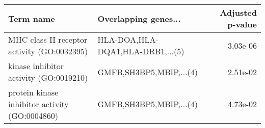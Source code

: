 \begin{tabular}{llr}
\toprule
                                     Term name &             Overlapping genes... &  Adjusted p-value \\
\midrule
   MHC class II receptor activity (GO:0032395) & HLA-DOA,HLA-DQA1,HLA-DRB1,...(5) &          3.03e-06 \\
        kinase inhibitor activity (GO:0019210) &          GMFB,SH3BP5,MBIP,...(4) &          2.51e-02 \\
protein kinase inhibitor activity (GO:0004860) &          GMFB,SH3BP5,MBIP,...(4) &          4.73e-02 \\
\bottomrule
\end{tabular}
